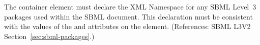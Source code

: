 The  container element must declare the XML Namespace for any
SBML Level~3 packages used within the SBML document.  This declaration must
be consistent with the values of the  and 
attributes on the  element.  (References: SBML L3V2
Section~\ref{sec:sbml-packages}.)
